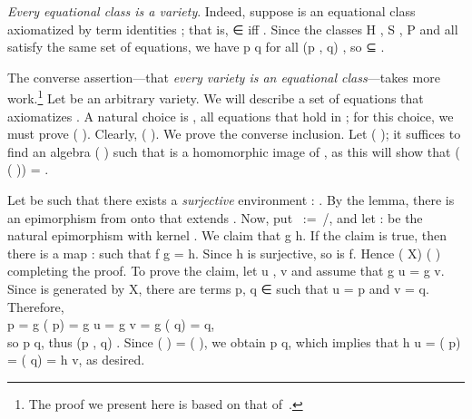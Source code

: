 \emph{Every equational class is a variety}. Indeed, suppose  is an equational
class axiomatized by term identities ; that is,  ∈  iff
  . Since the classes \af H , \af S , \af P  and
 all satisfy the same set of equations, we have    \ab p
 \ab q for all (\ab p , \ab q)  , so   ⊆ .

The converse assertion---that \emph{every variety is an equational class}---takes more
work.\footnote{The proof we present here is based on that of~\cite[Theorem 4.41]{Bergman:2012}.}
Let  be an arbitrary variety.  We will describe a set of equations that axiomatizes
.  A natural choice is  , all equations that hold in ;
for this choice, we must prove  \aof{=}  ( ).
Clearly,    ( ).  We prove the
converse inclusion. Let    ( ); 
it suffices to find an algebra    ( ) such that
 is a homomorphic image of , as this will show that  
 ( ( )) = .

Let  be such that there exists a \emph{surjective} environment
 :   .
By the  lemma, there is an epimorphism  from  onto 
that extends .
Now, put ~:=~/, and let  :   
be the natural epimorphism with kernel . We claim that  \ab g 
 \ab h. If the claim is true, then there is a map  :   
such that \ab f  \ab g = \ab h. Since \ab h is surjective, so is \ab f. Hence 
  ( \ab X)   ( ) completing the proof.
To prove the claim, let \ab u , \ab v   and assume that \ab g \ab u =
\ab g \ab v. Since  is generated by \ab X, there are terms \ab p, \ab q ∈
 such that \ab u =  \ab p and v =  \ab
q.
Therefore,\\[-4pt]

 \ab p = \ab g ( \ab p) = \ab g \ab u = \ab g \ab v =
\ab g ( \ab q) =  \ab q,\\[8pt]
so   \ab p  \ab q, thus (\ab p , \ab q)  
. Since    ( ) =
 ( ), we obtain   \ab p  \ab q, which implies
that \ab h \ab u = ( \ab p)   = ( \ab q)
  = \ab h \ab v, as desired.


